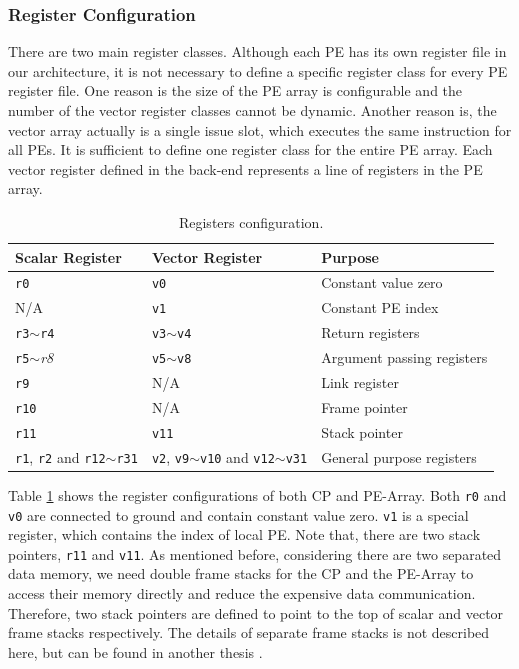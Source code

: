 \subsubsection{Register Configuration}
There are two main register classes. Although each PE has its own register file in our architecture, it is not necessary to define a specific register class for every PE register file. One reason is the size of the PE array is configurable and the number of the vector register classes cannot be dynamic. Another reason is, the vector array actually is a single issue slot, which executes the same instruction for all PEs. It is sufficient to define one register class for the entire PE array. Each vector register defined in the back-end represents a line of registers in the PE array.

\begin{table}[t]
\caption{Registers configuration.}
\begin{center}
\begin{tabular}{@{}l l l@{}}
\toprule
\textbf{Scalar Register} & \textbf{Vector Register} & \textbf{Purpose} \\ \hline
\texttt{r0} & \texttt{v0} & Constant value zero \\
N/A & \texttt{v1} & Constant PE index \\
\texttt{r3}$\sim$\texttt{r4}  & \texttt{v3}$\sim$\texttt{v4} & Return registers \\
\texttt{r5}$\sim$\emph{r8} & \texttt{v5}$\sim$\texttt{v8} & Argument passing registers \\
\texttt{r9} & N/A & Link register \\ 
\texttt{r10} & N/A & Frame pointer \\
\texttt{r11} & \texttt{v11} & Stack pointer \\
\texttt{r1}, \texttt{r2} and \texttt{r12}$\sim$\texttt{r31} & \texttt{v2}, \texttt{v9}$\sim$\texttt{v10} and \texttt{v12}$\sim$\texttt{v31} & General purpose registers \\
\bottomrule
\end{tabular}
\end{center}
\label{table:register_conf}
\end{table}%

Table \ref{table:register_conf} shows the register configurations of both CP and PE-Array.
Both \texttt{r0} and \texttt{v0} are connected to ground and contain constant value zero. \texttt{v1} is a special register, which contains the index of local PE. Note that, there are two stack pointers, \texttt{r11} and \texttt{v11}. As mentioned before, considering there are two separated data memory, we need double frame stacks for the CP and the PE-Array to access their memory directly and reduce the expensive data communication. Therefore, two stack pointers are defined to point to the top of scalar and vector frame stacks respectively. The details of separate frame stacks is not described here, but can be found in another thesis \cite[Chapter~4]{liu_zhenyuan}.

